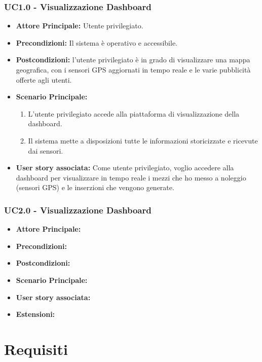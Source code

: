 \documentclass[11pt]{article}
\begin{document}
\begin{justify}
\subsubsection{\textbf{UC1.0 - Visualizzazione Dashboard}}
\begin{itemize}
    \item \textbf{Attore Principale:} Utente privilegiato.
    \item \textbf{Precondizioni:} Il sistema è operativo e accessibile.
    \item \textbf{Postcondizioni:} l'utente privilegiato è in grado di visualizzare una mappa geografica, con i sensori GPS aggiornati in tempo reale e le varie pubblicità offerte agli utenti.
    \item \textbf{Scenario Principale:}
    \begin{enumerate}
        \item L'utente privilegiato accede alla piattaforma di visualizzazione della dashboard.
        \item Il sistema mette a disposizioni tutte le informazioni storicizzate e ricevute dai sensori.
    \end{enumerate}
    \item \textbf{User story associata:} Come utente privilegiato, voglio accedere alla dashboard per visualizzare in tempo reale i mezzi che ho messo a noleggio (sensori GPS) e le inserzioni che vengono generate.
    
\end{itemize}

\subsubsection{\textbf{UC2.0 - Visualizzazione Dashboard}}
\begin{itemize}
     \item \textbf{Attore Principale:}
     \item \textbf{Precondizioni:}
     \item \textbf{Postcondizioni:}
     \item \textbf{Scenario Principale:}
     \item \textbf{User story associata:}
     \item \textbf{Estensioni:}
\end{itemize}


\newpage
\section{Requisiti}

\end{justify}
\end{document}
